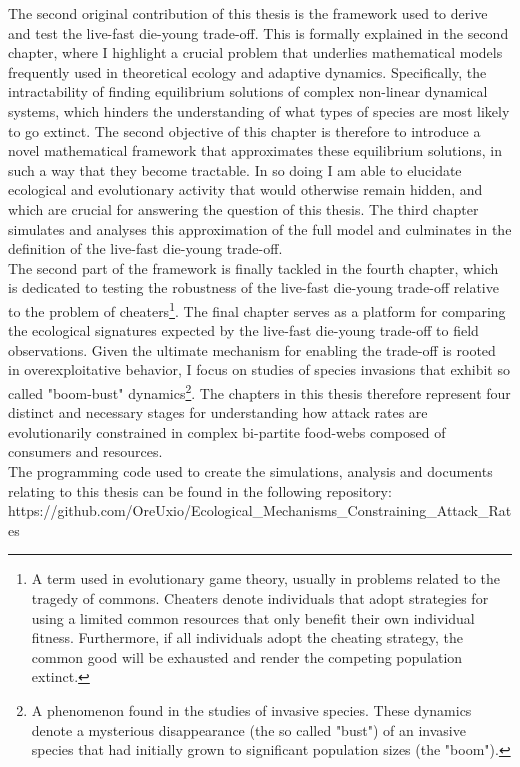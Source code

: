 \documentclass[a4paper]{report}
\begin{document}
The second original contribution of this thesis is the framework used to derive and test the live-fast die-young trade-off. This is formally explained in the second chapter, where I highlight a crucial problem that underlies mathematical models frequently used in theoretical ecology and adaptive dynamics. Specifically, the intractability of finding equilibrium solutions of complex non-linear dynamical systems, which hinders the understanding of what types of species are most likely to go extinct. The second objective of this chapter is therefore to introduce a novel mathematical framework that approximates these equilibrium solutions, in such a way that they become tractable. In so doing I am able to elucidate ecological and evolutionary activity that would otherwise remain hidden, and which are crucial for answering the question of this thesis. The third chapter simulates and analyses this approximation of the full model and culminates in the definition of the live-fast die-young trade-off.\\

 The second part of the framework is finally tackled in the fourth chapter, which is dedicated to testing the robustness of the live-fast die-young trade-off relative to the problem of cheaters\footnote{A term used in evolutionary game theory, usually in problems related to the tragedy of commons. Cheaters denote individuals that adopt strategies for using a limited common resources that only benefit their own individual fitness. Furthermore, if all individuals adopt the cheating strategy, the common good will be exhausted and render the competing population extinct.}. The final chapter serves as a platform for comparing the ecological signatures expected by the live-fast die-young trade-off to field observations. Given the ultimate mechanism for enabling the trade-off is rooted in overexploitative behavior, I focus on studies of species invasions that exhibit so called "boom-bust" dynamics\footnote{A phenomenon found in the studies of invasive species. These dynamics denote a mysterious disappearance (the so called "bust") of an invasive species that had initially grown to significant population sizes (the "boom").}. The chapters in this thesis therefore represent four distinct and necessary stages for understanding how attack rates are evolutionarily constrained in complex bi-partite food-webs composed of consumers and resources. \\
 
 
The programming code used to create the simulations, analysis and documents relating to this thesis can be found in the following repository: https://github.com/OreUxio/Ecological_Mechanisms_Constraining_Attack_Rates
\end{document}
